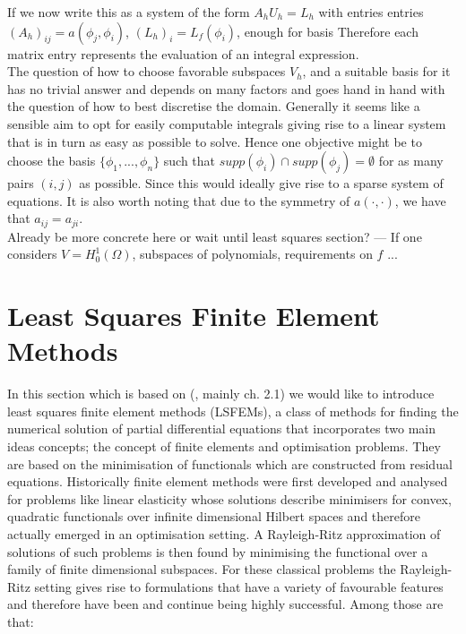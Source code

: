 \documentclass[../draft_1.tex]{subfiles}
\begin{document}
If we now write this as a system of the form $A_h U_h = L_h$ with entries entries $(A_h)_{ij} = a(\phi_j, \phi_i)$, $(L_h)_i = L_f(\phi_i)$, 
enough for basis
Therefore each matrix entry represents the evaluation of an integral expression. 
\bigskip
\\
The question of how to choose favorable subspaces $V_h$, and a suitable basis for it has no trivial answer and depends on many factors and goes hand in hand with the question of how to best discretise the domain. Generally it seems like a sensible aim to opt for easily computable integrals giving rise to a linear system that is in turn as easy as possible to solve. Hence one objective might be to choose the basis $\{\phi_1, ..., \phi_n \}$ such that $supp(\phi_i) \cap supp(\phi_j) = \emptyset$ for as many pairs $(i,j)$ as possible. Since this would ideally give rise to a sparse system of equations. It is also worth noting that due to the symmetry of $a(\cdot, \cdot)$, we have that $a_{ij} = a_{ji}$. 
\bigskip
\\
Already be more concrete here or wait until least squares section? ---
If one considers $V = H_0^1(\Omega)$, subspaces of polynomials, requirements on $f$ ... 

\section{Least Squares Finite Element Methods}

In this section which is based on (\cite{bochev2009least}, mainly ch. 2.1) we would like to introduce least squares finite element methods (LSFEMs), a class of methods for finding the numerical solution of partial differential equations that incorporates two main ideas concepts; the concept of finite elements and optimisation problems. They are based on the minimisation of functionals which are constructed from residual equations. Historically finite element methods were first developed and analysed for problems like linear elasticity whose solutions describe minimisers for convex, quadratic functionals over infinite dimensional Hilbert spaces and therefore actually emerged in an optimisation setting. A Rayleigh-Ritz approximation of solutions of such problems is then found by minimising the functional over a family of finite dimensional subspaces. For these classical problems the Rayleigh-Ritz setting gives rise to formulations that have a variety of favourable features and therefore have been and continue being highly successful.  Among those are that:
\end{document}
